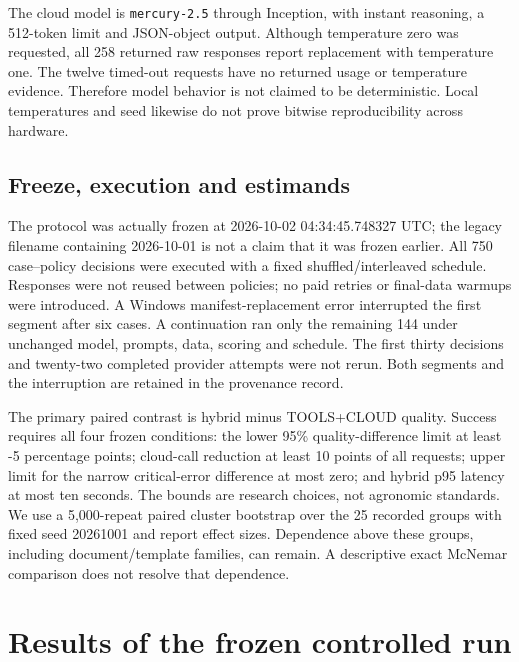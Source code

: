 \documentclass[10pt,a4paper,twocolumn]{article}
\begin{document}
The cloud model is \texttt{mercury-2.5} through Inception, with instant reasoning, a 512-token limit and JSON-object output. Although temperature zero was requested, all 258 returned raw responses report replacement with temperature one. The twelve timed-out requests have no returned usage or temperature evidence. Therefore model behavior is not claimed to be deterministic. Local temperatures and seed likewise do not prove bitwise reproducibility across hardware.

\subsection{Freeze, execution and estimands}

The protocol was actually frozen at 2026-10-02 04:34:45.748327 UTC; the legacy filename containing 2026-10-01 is not a claim that it was frozen earlier. All 750 case--policy decisions were executed with a fixed shuffled/interleaved schedule. Responses were not reused between policies; no paid retries or final-data warmups were introduced. A Windows manifest-replacement error interrupted the first segment after six cases. A continuation ran only the remaining 144 under unchanged model, prompts, data, scoring and schedule. The first thirty decisions and twenty-two completed provider attempts were not rerun. Both segments and the interruption are retained in the provenance record.

The primary paired contrast is hybrid minus TOOLS+CLOUD quality. Success requires all four frozen conditions: the lower 95\% quality-difference limit at least -5 percentage points; cloud-call reduction at least 10 points of all requests; upper limit for the narrow critical-error difference at most zero; and hybrid p95 latency at most ten seconds. The bounds are research choices, not agronomic standards. We use a 5,000-repeat paired cluster bootstrap over the 25 recorded groups with fixed seed 20261001 and report effect sizes. Dependence above these groups, including document/template families, can remain. A descriptive exact McNemar comparison does not resolve that dependence.

\section{Results of the frozen controlled run}
\end{document}
